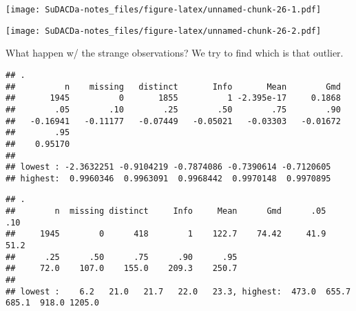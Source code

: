 \documentclass[]{book}
\newenvironment{Shaded}{\begin{snugshade}}{\end{snugshade}}
\newcommand{\KeywordTok}[1]{\textcolor[rgb]{0.13,0.29,0.53}{\textbf{{#1}}}}
\newcommand{\DataTypeTok}[1]{\textcolor[rgb]{0.13,0.29,0.53}{{#1}}}
\newcommand{\StringTok}[1]{\textcolor[rgb]{0.31,0.60,0.02}{{#1}}}
\newcommand{\CommentTok}[1]{\textcolor[rgb]{0.56,0.35,0.01}{\textit{{#1}}}}
\newcommand{\NormalTok}[1]{{#1}}
\theoremstyle{definition}
\theoremstyle{definition}
\theoremstyle{definition}
\theoremstyle{remark}
\begin{document}
\texttt{[image: SuDACDa-notes\_files/figure-latex/unnamed-chunk-26-1.pdf]}

\begin{Shaded}
\end{Shaded}

\texttt{[image: SuDACDa-notes\_files/figure-latex/unnamed-chunk-26-2.pdf]}

What happen w/ the strange observations? We try to find which is that
outlier.

\begin{Shaded}
\end{Shaded}

\begin{verbatim}
## . 
##          n    missing   distinct       Info       Mean        Gmd 
##       1945          0       1855          1 -2.395e-17     0.1868 
##        .05        .10        .25        .50        .75        .90 
##   -0.16941   -0.11177   -0.07449   -0.05021   -0.03303   -0.01672 
##        .95 
##    0.95170 
## 
## lowest : -2.3632251 -0.9104219 -0.7874086 -0.7390614 -0.7120605
## highest:  0.9960346  0.9963091  0.9968442  0.9970148  0.9970895
\end{verbatim}

\begin{Shaded}
\end{Shaded}

\begin{verbatim}
## . 
##        n  missing distinct     Info     Mean      Gmd      .05      .10 
##     1945        0      418        1    122.7    74.42     41.9     51.2 
##      .25      .50      .75      .90      .95 
##     72.0    107.0    155.0    209.3    250.7 
## 
## lowest :    6.2   21.0   21.7   22.0   23.3, highest:  473.0  655.7  685.1  918.0 1205.0
\end{verbatim}
\end{document}

